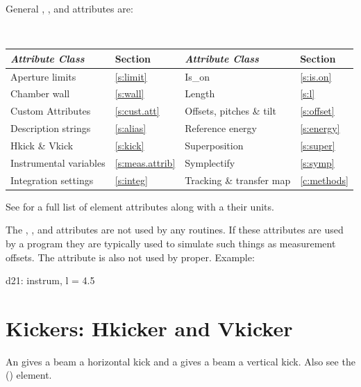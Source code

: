General , , and  attributes are:
\begin{center}
\tt
\begin{tabular}{llll} \toprule
  {\sl Attribute Class}      & Section             & {\sl Attribute Class}      & Section         \\ \midrule
  Aperture limits            & \ref{s:limit}       & Is_on                      & \ref{s:is.on}   \\
  Chamber wall               & \ref{s:wall}        & Length                     & \ref{s:l}       \\
  Custom Attributes          & \ref{s:cust.att}    & Offsets, pitches \& tilt   & \ref{s:offset}  \\ 
  Description strings        & \ref{s:alias}       & Reference energy           & \ref{s:energy}  \\
  Hkick \& Vkick             & \ref{s:kick}        & Superposition              & \ref{s:super}   \\
  Instrumental variables     & \ref{s:meas.attrib} & Symplectify                & \ref{s:symp}    \\
  Integration settings       & \ref{s:integ}       & Tracking \& transfer map   & \ref{c:methods} \\
  \bottomrule
\end{tabular}
\end{center}
\toffset
See  for a full list of element attributes along with a their units.

The , , and  attributes are not
used by any \bmad routines. If these attributes are used by a program
they are typically used to simulate such things as measurement
offsets. The  attribute is also not used by \bmad
proper. Example:
\begin{example}
  d21: instrum, l = 4.5
\end{example}

\newpage

\section{Kickers: Hkicker and Vkicker}
\label{s:hvkicker}

An  gives a beam a horizontal kick and a  gives a 
beam a vertical kick. Also see the  () element.

